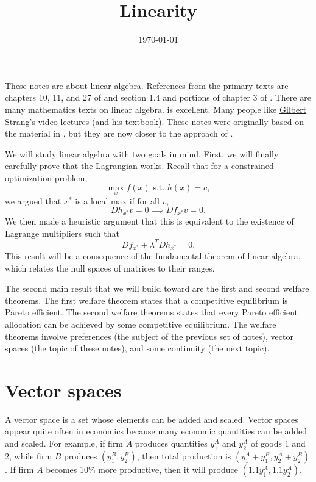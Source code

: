  


\title{Linearity}
\date{\today}



\maketitle

These notes are about linear algebra. References from the primary
texts are chapters 10, 11, and 27 of \cite{sb1994} and section 1.4 and
portions of chapter 3 of \cite{carter2001}. There are many mathematics
texts on linear algebra.  \cite{axler1997} is excellent. Many people
like
\href{http://ocw.mit.edu/courses/mathematics/18-06-linear-algebra-spring-2010/video-lectures/}
{Gilbert Strang's video lectures} (and his textbook). These notes were
originally based on the material in \cite{sb1994}, but they are now
closer to the approach of \cite{axler1997}. 

We will study linear algebra with two goals in mind. First, we will
finally carefully prove that the Lagrangian works. Recall that for a
constrained optimization problem, 
\[ \max_x f(x) \text{ s.t.  } h(x) = c, \]
we argued that $x^*$ is a local max if for all $v$, 
\[ Dh_{x^*} v = 0 \implies Df_{x^*} v = 0. \] 
We then made a heuristic argument that this is equivalent to the
existence of Lagrange multipliers such that 
\[ Df_{x^*} + \lambda^T Dh_{x^*} = 0. \]
This result will be a consequence of the fundamental theorem of linear
algebra, which relates the null spaces of matrices to their ranges. 

The second main result that we will build toward are the first and
second welfare theorems. The first welfare theorem states that a
competitive equilibrium is Pareto efficient. The second welfare
theorems states that every Pareto efficient allocation can be achieved
by some competitive equilibrium. The welfare theorems involve
preferences (the subject of the previous set of notes), vector spaces
(the topic of these notes), and some continuity (the next topic). 

\section{Vector spaces}

A vector space is a set whose elements can be added and scaled. Vector
spaces appear quite often in economics because many economic
quantities can be added and scaled. For example, if firm $A$ produces
quantities $y_1^A$ and $y_2^A$ of goods $1$ and $2$, while firm $B$
produces $(y_1^B,y_2^B)$, then total production is $(y_1^A+y_1^B,
y_2^A+y_2^B)$. If firm $A$ becomes 10\% more productive, then it will
produce $(1.1 y_1^A, 1.1 y_2^A)$.

